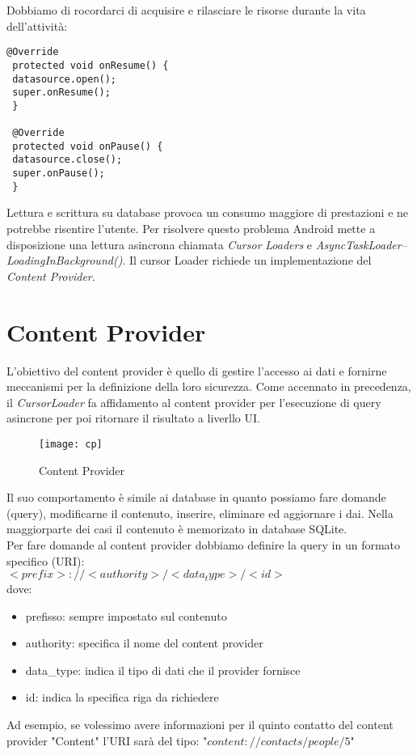 Dobbiamo di rocordarci di acquisire e rilasciare le risorse durante la vita dell'attività:
\begin{lstlisting}[frame=single]
@Override
 protected void onResume() {
 datasource.open();
 super.onResume();
 }

 @Override
 protected void onPause() {
 datasource.close();
 super.onPause();
 }
\end{lstlisting}
Lettura e scrittura su database provoca un consumo maggiore di prestazioni e ne potrebbe risentire l'utente. Per risolvere questo problema Android mette a disposizione una lettura asincrona chiamata \textit{Cursor} \textit{Loaders} e \textit{AsyncTaskLoader}\textit{--}\textit{LoadingInBackground()}. Il cursor Loader richiede un implementazione del \textit{Content Provider}.
\section{Content Provider}
L'obiettivo del content provider è quello di gestire l'accesso ai dati e fornirne meccanismi per la definizione della loro sicurezza. Come accennato in precedenza, il \textit{CursorLoader} fa affidamento al content provider per l'esecuzione di query asincrone per poi ritornare il risultato a liverllo UI.
\begin{figure}
    \centering
    \texttt{[image: cp]}
    \caption{Content Provider}
    \label{fig:my_label}
\end{figure}
Il suo comportamento è simile ai database in quanto possiamo fare domande (query), modificarne il contenuto, inserire, eliminare ed aggiornare i dai. Nella maggiorparte dei casi il contenuto è memorizato in database SQLite. \\Per fare domande al content provider dobbiamo definire la query in un formato specifico (URI):\\$<prefix>://<authority>/<data_type>/<id>$\\
dove:
\begin{itemize}
    \item prefisso: sempre impostato sul contenuto
    \item authority: specifica il nome del content provider
    \item data\_type: indica il tipo di dati che il provider fornisce
    \item id: indica la specifica riga da richiedere
\end{itemize}
Ad esempio, se volessimo avere informazioni per il quinto contatto del content provider "Content" l'URI sarà del tipo: "$content://contacts/people/5$"
